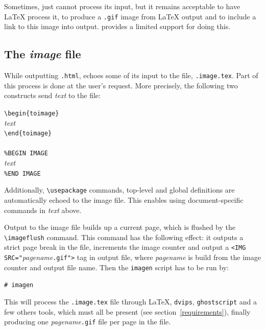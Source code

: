 \label{imagen}
Sometimes,
\hevea{} just cannot process its input, but it remains acceptable to
have \LaTeX{} process it, to produce a \texttt{.gif} image from
\LaTeX{} output and to include a link to this image into \hevea{}
output.
\hevea{} provides a limited support for doing this.

\subsection{The \textit{image}\label{image:file} file}

While outputting \texttt{.html}, \hevea{} echoes some
of its input to the  file,
\texttt{.image.tex}.
Part of this process is done at the user's request.
More precisely, the following two constructs
send \textit{text} to the  file:
\begin{flushleft}
\verb+\begin{toimage}+\\
\textit{text}\\
\verb+\end{toimage}+\\
~\\
\verb+%BEGIN IMAGE+\\
\textit{text}\\
\verb+%END IMAGE+
\end{flushleft}
Additionally, \verb+\usepackage+ commands, top-level and global
definitions
are automatically echoed to the image file. This enables using
document-specific commands in \textit{text} above.


Output to the image file builds up a current page, which is flushed
by the \verb+\imageflush+ command.
This command has the following effect:  it outputs a strict page break
in the  file, increments the image counter and
output a \verb+<IMG SRC="+\textit{pagename}\verb+.gif">+ tag in \hevea{}
output file, where \textit{pagename} is build from the image counter
and \hevea{} output file name.
Then the \verb+imagen+ script has to be run by:
\begin{flushleft}
\verb+# imagen+ 
\end{flushleft}
\noindent This will process the \texttt{.image.tex}
file through \LaTeX,
\texttt{dvips}, \texttt{ghostscript} and a few others tools, which must all be
present  (see section~\ref{requirements}), finally producing one
\textit{pagename}\texttt{.gif} file per page in the 
file.

